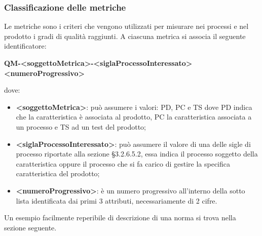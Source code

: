         \subsubsection{Classificazione delle metriche}
            Le metriche sono i criteri che vengono utilizzati per misurare nei processi e nel prodotto i gradi di qualità raggiunti. A ciascuna metrica si associa il seguente identificatore:
            \begin{center}
                \textbf{QM-<soggettoMetrica>-<siglaProcessoInteressato><numeroProgressivo>}
            \end{center}
            dove:
            \begin{itemize}
                \item\textbf{<soggettoMetrica>}: può assumere i valori: PD, PC e TS dove PD indica che la caratteristica è associata al prodotto,  PC la caratteristica associata a un processo e TS ad un test del prodotto;
                \item\textbf{<siglaProcessoInteressato>}: può assumere il valore di una delle sigle di processo riportate alla sezione §3.2.6.5.2, essa indica il processo soggetto della caratteristica oppure il processo che si fa carico di gestire la specifica caratteristica del prodotto;
                \item\textbf{<numeroProgressivo>}: è un numero progressivo all’interno della sotto lista identificata dai primi 3 attributi, necessariamente di 2 cifre.
            \end{itemize}
            Un esempio facilmente reperibile di descrizione di una norma si trova nella sezione seguente.
